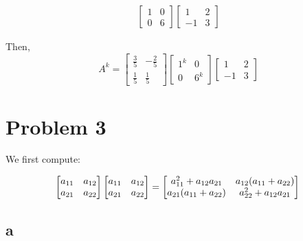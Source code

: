 \documentclass[12pt,letterpaper]{article}
\theoremstyle{definition}
\begin{document}
\begin{align*}
\begin{bmatrix}
                                                                      1 & 0 \\
                                                                      0 & 6
                                                                    \end{bmatrix}
                                                                          \begin{bmatrix}
                                                                            1 & 2 \\
                                                                            -1 & 3
                                                                          \end{bmatrix}
\end{align*}

Then,
\[
  A^k = \begin{bmatrix}
    \frac{3}{5} & -\frac{2}{5} \\
    \frac{1}{5} & \frac{1}{5}
  \end{bmatrix}
  \begin{bmatrix}
    1^k & 0 \\
    0 & 6^k
  \end{bmatrix}
  \begin{bmatrix}
    1 & 2 \\
    -1 & 3
  \end{bmatrix}
\]

\section*{Problem 3}

We first compute:

\[
  \begin{bmatrix}
    a_{11} & a_{12} \\
    a_{21} & a_{22}
  \end{bmatrix}
  \begin{bmatrix}
    a_{11} & a_{12} \\
    a_{21} & a_{22}
  \end{bmatrix} = 
  \begin{bmatrix}
    a_{11}^2 + a_{12}a_{21} & a_{12}(a_{11} + a_{22}) \\
    a_{21}(a_{11} + a_{22}) & a_{22}^2 + a_{12}a_{21}
  \end{bmatrix} \\
\]

\subsection*{a}
\end{document}
